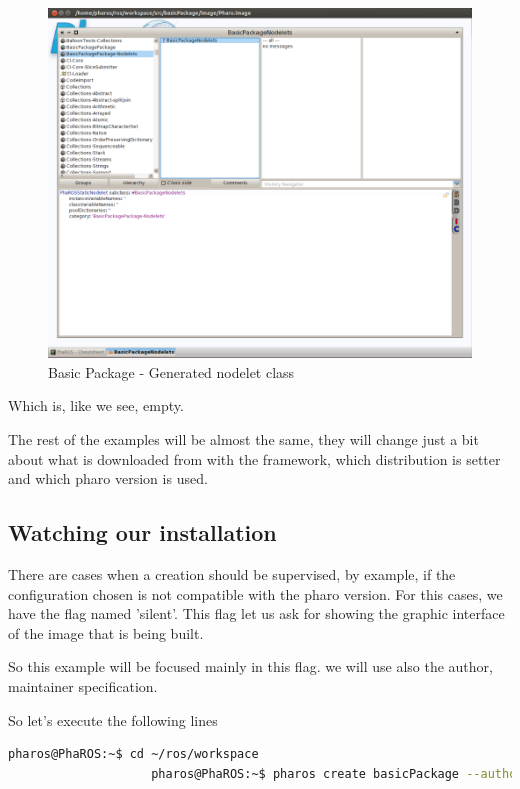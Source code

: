 \documentclass[a4paper,10pt,twoside]{book}
\begin{document}
				\begin{figure}[!htbp]
			  		\centering
				    		\includegraphics[width=1\textwidth]{BasicPackage3.png}
						
						\caption{Basic Package - Generated nodelet class}
					\centering
				\end{figure}
				
				
				Which is, like we see, empty.
				
				The rest of the examples will be almost the same, they will change just a bit about what is downloaded from with the framework, which distribution is setter and which pharo version is used.
				
				
				
				\subsection{Watching our installation}
				
				
				There are cases when a creation should be supervised, by example, if the configuration chosen is not compatible with the pharo version.
				For this cases, we have the flag named 'silent'. This flag let us ask for showing the graphic interface of the image that is being built.
				
				So this example will be focused mainly in this flag. 
				we will use also the author, maintainer specification.
				
				So let's execute the following lines

				\begin{lstlisting}[language=bash,title={ Unsilent package creation }]
					pharos@PhaROS:~$ cd ~/ros/workspace
					pharos@PhaROS:~$ pharos create basicPackage --author="MyUserName" --author-email="user@mail.com" --maintainer="OtherUserName" --silent=false
				\end{lstlisting} 
				
\end{document}
